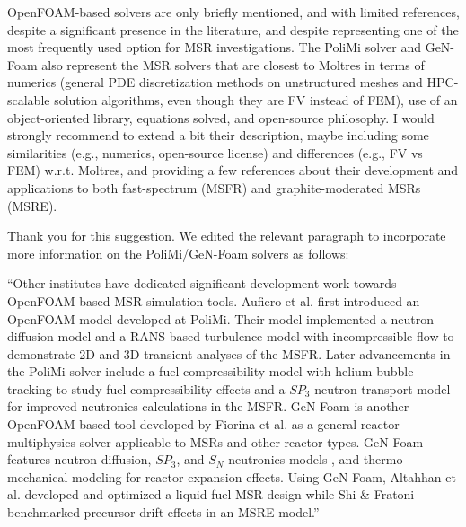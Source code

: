 \documentclass[answers,11pt]{exam}
\begin{document}
\begin{questions}
        \question OpenFOAM-based solvers are only briefly mentioned, and with
        limited references, despite a significant presence in the literature,
        and despite representing one of the most frequently used option for MSR
        investigations. The PoliMi solver and GeN-Foam also represent the MSR
        solvers that are closest to Moltres in terms of numerics (general PDE
        discretization methods on unstructured meshes and HPC-scalable solution
        algorithms,  even though they are FV instead of FEM), use of an
        object-oriented library, equations solved, and open-source philosophy.
        I would strongly recommend to extend a bit their description, maybe
        including some similarities (e.g., numerics, open-source license) and
        differences (e.g., FV vs FEM) w.r.t. Moltres, and providing a few
        references about their development and applications to both
        fast-spectrum (MSFR) and graphite-moderated MSRs (MSRE).
        \begin{solution}
        	Thank you for this suggestion. We edited the relevant paragraph to
        	incorporate more information on the PoliMi/GeN-Foam solvers as
        	follows:
        	
        	``Other institutes have dedicated significant development work towards
OpenFOAM-based \gls{MSR} simulation tools. Aufiero et al.
\cite{aufiero_development_2014} first introduced an OpenFOAM model developed
at \gls{PoliMi}. Their model implemented a neutron diffusion model and a
\gls{RANS}-based turbulence model with incompressible flow to demonstrate 2D
and 3D transient analyses of the \gls{MSFR}. Later advancements in the
\gls{PoliMi} solver include a fuel compressibility model with helium bubble
tracking to study fuel compressibility effects
\cite{cervi_development_2019} and a $SP_3$ neutron transport
model for improved neutronics calculations \cite{cervi_development_2019-1} in
the \gls{MSFR}. GeN-Foam is another OpenFOAM-based tool developed by Fiorina
et al. \cite{fiorina_gen-foam_2015} as a general reactor multiphysics solver
applicable to \glspl{MSR} and other reactor types. GeN-Foam features neutron
diffusion, $SP_3$, and $S_N$ neutronics models 
\cite{fiorina_development_2016,fiorina_gen-foam_2015,fiorina_detailed_2019},
and thermo-mechanical modeling for reactor expansion effects. Using GeN-Foam,
Altahhan et al. \cite{altahhan_preliminary_2020} developed and optimized a
liquid-fuel \gls{MSR} design while Shi \& Fratoni \cite{shi_gen-foam_2021}
benchmarked precursor drift effects in an \gls{MSRE} model.''
            

\end{solution}
\end{questions}
\end{document}

